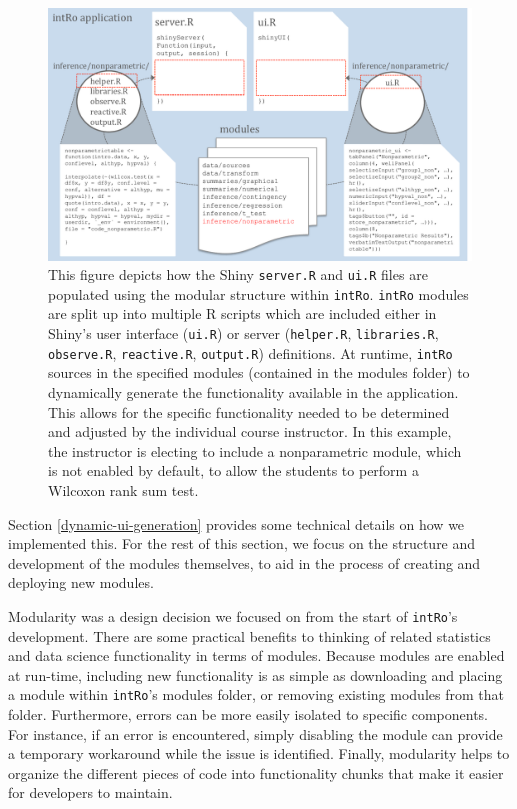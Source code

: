 \documentclass[12pt,]{article}
\begin{document}
\begin{figure}[ht!]
\centering
\includegraphics[width=\linewidth]{images/app_creation_modules.pdf}
\caption{This figure depicts how the Shiny \texttt{server.R} and \texttt{ui.R} files are populated using the modular structure within \texttt{intRo}. \texttt{intRo} modules are split up into multiple R scripts which are included either in Shiny's user interface (\texttt{ui.R}) or server (\texttt{helper.R}, \texttt{libraries.R}, \texttt{observe.R}, \texttt{reactive.R}, \texttt{output.R}) definitions. At runtime, \texttt{intRo} sources in the specified modules (contained in the modules folder) to dynamically generate the functionality available in the application. This allows for the specific functionality needed to be determined and adjusted by the individual course instructor. In this example, the instructor is electing to include a nonparametric module, which is not enabled by default, to allow the students to perform a Wilcoxon rank sum test.}
\label{fig:app_creation_modules}
\end{figure}

Section \ref{dynamic-ui-generation} provides some technical details on
how we implemented this. For the rest of this section, we focus on the
structure and development of the modules themselves, to aid in the
process of creating and deploying new modules.

Modularity was a design decision we focused on from the start of
\texttt{intRo}'s development. There are some practical benefits to
thinking of related statistics and data science functionality in terms
of modules. Because modules are enabled at run-time, including new
functionality is as simple as downloading and placing a module within
\texttt{intRo}'s modules folder, or removing existing modules from that
folder. Furthermore, errors can be more easily isolated to specific
components. For instance, if an error is encountered, simply disabling
the module can provide a temporary workaround while the issue is
identified. Finally, modularity helps to organize the different pieces
of code into functionality chunks that make it easier for developers to
maintain.
\end{document}
